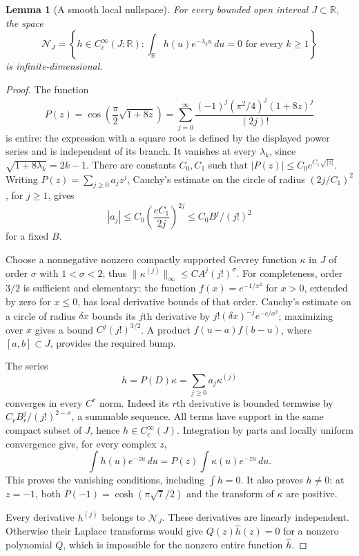 \documentclass[11pt]{article}
\newtheorem{lemma}[theorem]{Lemma}
\theoremstyle{definition}
\theoremstyle{remark}
\numberwithin{equation}{section}
\begin{document}
\begin{lemma}[A smooth local nullspace]\label{phy:nullspace}
For every bounded open interval $J\subset\mathbb R$, the space
\[
 \mathcal N_J=\left\{h\in C_c^\infty(J;\mathbb R):
      \int_{\mathbb R}h(u)e^{-\lambda_k u}\,du=0
                        \text{ for every }k\ge1\right\}
\]
is infinite-dimensional.
\end{lemma}
\begin{proof}
The function
\[
 P(z)=\cos\left(\frac\pi2\sqrt{1+8z}\right)
     =\sum_{j=0}^\infty
       \frac{(-1)^j(\pi^2/4)^j(1+8z)^j}{(2j)!}
\]
is entire: the expression with a square root is defined by the displayed
power series and is independent of its branch. It vanishes at every
$\lambda_k$, since $\sqrt{1+8\lambda_k}=2k-1$.
There are constants $C_0,C_1$ such that
$|P(z)|\le C_0e^{C_1\sqrt{|z|}}$.
Writing $P(z)=\sum_{j\ge0}a_jz^j$, Cauchy's estimate on the circle of
radius $(2j/C_1)^2$, for $j\ge1$, gives
\[
 |a_j|\le C_0\left(\frac{eC_1}{2j}\right)^{2j}
          \le C_0 B^j/(j!)^2
\]
for a fixed $B$.

Choose a nonnegative nonzero compactly supported Gevrey function
$\kappa$ in $J$ of order $\sigma$ with $1<\sigma<2$; thus
$\|\kappa^{(j)}\|_\infty\le C A^j(j!)^\sigma$.
For completeness, order $3/2$ is sufficient and elementary: the function
$f(x)=e^{-1/x^2}$ for $x>0$, extended by zero for $x\le0$, has
local derivative bounds of that order. Cauchy's estimate on a circle
of radius $\delta x$ bounds its $j$th derivative by
$j!(\delta x)^{-j}e^{-c/x^2}$; maximizing over $x$ gives a bound
$C^j(j!)^{3/2}$. A product $f(u-a)f(b-u)$, where
$[a,b]\subset J$, provides the required bump.

The series
\[
                     h=P(D)\kappa=\sum_{j\ge0}a_j\kappa^{(j)}
\]
converges in every $C^r$ norm. Indeed its $r$th derivative is bounded
termwise by $C_rB_r^j/(j!)^{2-\sigma}$, a summable sequence.
All terms have support in the same compact subset of $J$, hence
$h\in C_c^\infty(J)$. Integration by parts and locally uniform
convergence give, for every complex $z$,
\[
 \int h(u)e^{-zu}\,du
       =P(z)\int\kappa(u)e^{-zu}\,du.
\]
This proves the vanishing conditions, including $\int h=0$.
It also proves $h\ne0$: at $z=-1$, both
$P(-1)=\cosh(\pi\sqrt7/2)$ and the transform of $\kappa$ are positive.

Every derivative $h^{(j)}$ belongs to $\mathcal N_J$. These derivatives
are linearly independent. Otherwise their Laplace transforms would
give $Q(z)\widehat h(z)=0$ for a nonzero polynomial $Q$, which is
impossible for the nonzero entire function $\widehat h$.
\end{proof}
\end{document}
